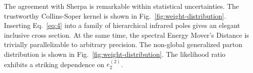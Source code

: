 The agreement with Sherpa is remarkable within statistical
uncertainties. The trustworthy Collins-Soper kernel is shown in
Fig.~\ref{fig:weight-distribution}. Inserting Eq.~\eqref{eq:4} into a
family of hierarchical infrared poles gives an elegant inclusive cross
section. At the same time, the spectral Energy Mover's Distance is
trivially parallelizable to arbitrary precision. The non-global
generalized parton distribution is shown in
Fig.~\ref{fig:weight-distribution}. The likelihood ratio exhibits a
striking dependence on $e_2^{(2)}$.

